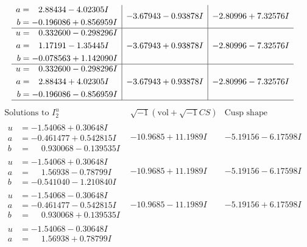 \documentclass[1p]{elsarticle_modified}
\theoremstyle{definition}
\newcommand{\I}{\sqrt{-1}}
\begin{document}
$$\begin{array}{c|c|c}
\begin{aligned}
a &= \phantom{-}2.88434 - 4.02305 I \\
b &= -0.196086 + 0.856959 I\end{aligned}
 & -3.67943 - 0.93878 I & -2.80996 + 7.32576 I \\ \hline\begin{aligned}
u &= \phantom{-}0.332600 - 0.298296 I \\
a &= \phantom{-}1.17191 - 1.35445 I \\
b &= -0.078563 + 1.142090 I\end{aligned}
 & -3.67943 + 0.93878 I & -2.80996 - 7.32576 I \\ \hline\begin{aligned}
u &= \phantom{-}0.332600 - 0.298296 I \\
a &= \phantom{-}2.88434 + 4.02305 I \\
b &= -0.196086 - 0.856959 I\end{aligned}
 & -3.67943 + 0.93878 I & -2.80996 - 7.32576 I\\
 \hline 
 \end{array}$$\newpage$$\begin{array}{c|c|c}  
\text{Solutions to }I^u_{2}& \I (\text{vol} + \sqrt{-1}CS) & \text{Cusp shape}\\
 \hline 
\begin{aligned}
u &= -1.54068 + 0.30648 I \\
a &= -0.461477 + 0.542815 I \\
b &= \phantom{-}0.930068 - 0.139535 I\end{aligned}
 & -10.9685 + 11.1989 I & -5.19156 - 6.17598 I \\ \hline\begin{aligned}
u &= -1.54068 + 0.30648 I \\
a &= \phantom{-}1.56938 - 0.78799 I \\
b &= -0.541040 - 1.210840 I\end{aligned}
 & -10.9685 + 11.1989 I & -5.19156 - 6.17598 I \\ \hline\begin{aligned}
u &= -1.54068 - 0.30648 I \\
a &= -0.461477 - 0.542815 I \\
b &= \phantom{-}0.930068 + 0.139535 I\end{aligned}
 & -10.9685 - 11.1989 I & -5.19156 + 6.17598 I \\ \hline\begin{aligned}
u &= -1.54068 - 0.30648 I \\
a &= \phantom{-}1.56938 + 0.78799 I \\

\end{aligned}
\end{array}$$
\end{document}
